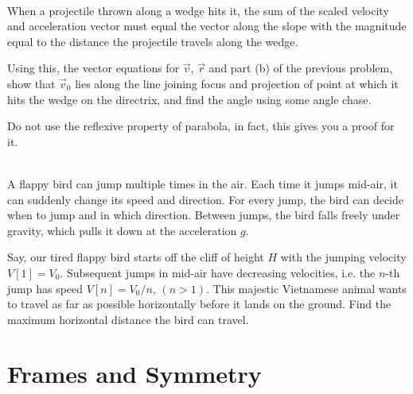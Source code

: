 \begin{exc}
        \begin{exercise}[subtitle={Projectiles with Vector, V2.}, points = 3]
            \smallskip
            ~\\
            When a projectile thrown along a wedge hits it, the sum of the scaled velocity and acceleration vector 
            must equal the vector along the slope with the magnitude equal to the distance the projectile travels 
            along the wedge. 
            
            Using this, the vector equations for $\vec{v}$, $\vec{r}$ and part (b) of the previous problem,
            show that $\vec{v}_0$ lies along the line joining focus and 
            projection of point at which it hits the wedge on the directrix, and find the angle using some angle chase.
            
            Do not use the reflexive property of parabola, in fact, this gives you a proof for it.
        \end{exercise}

        \begin{exercise}[subtitle={Tired Flappy Bird, OPhO}, points = 4]
            \smallskip
            ~\\
            A flappy bird can jump multiple times in the air. Each time it jumps
            mid-air, it can suddenly change its speed and direction. For every jump, the bird can decide when to jump
            and in which direction. Between jumps, the bird falls freely under gravity, which pulls it down at the
            acceleration $g$. 
            
            Say, our tired flappy bird starts off the cliff of height $H$ with the jumping velocity $V [1] = V_0$.
            Subsequent jumps in mid-air have decreasing velocities, i.e. the $n$-th jump has speed $V [n] = V_0/n$, $(n > 1)$.
            This majestic Vietnamese animal wants to travel as far as possible horizontally before it lands on the
            ground. Find the maximum horizontal distance the bird can travel.
        \end{exercise}
    \end{exc}


    \section{Frames and Symmetry}  
    
